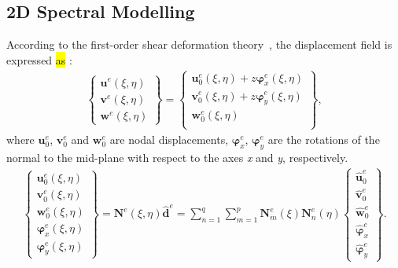 \documentclass[sensors,article,accept,moreauthors,pdftex]{Definitions/mdpi}
\begin{document}
\subsection{2D Spectral Modelling}
\label{sec:2D_SEM}

According to the first-order shear deformation theory~\cite{reissner1945effect, mindlin1951influence}, the displacement field is expressed \hl{as}%
:
\begin{eqnarray}
\left \{ \begin{array}{c}
\textbf{u}^e(\xi,\eta) \\
\textbf{v}^e(\xi,\eta) \\
\textbf{w}^e(\xi,\eta)
\end{array} \right\} = 
\left \{ \begin{array}{c}
\textbf{u}_0^e(\xi,\eta) + z\boldsymbol{\varphi}_x^e(\xi,\eta)\\
\textbf{v}_0^e(\xi,\eta) + z\boldsymbol{\varphi}_y^e(\xi,\eta)\\
\textbf{w}_0^e(\xi,\eta) \\
\end{array} \right\},
\end{eqnarray}
where \(\textbf{u}_0^e\), \(\textbf{v}_0^e\) and \(\textbf{w}_0^e\) are nodal displacements, \(\boldsymbol{\varphi}_x^e\), \(\boldsymbol{\varphi}_y^e\) are the rotations of the normal to the mid-plane with respect to the axes \textit{x} and \textit{y}, respectively.
\begin{eqnarray}
\left \{\begin{array}{c}
\textbf{u}_0^e(\xi,\eta) \\
\textbf{v}_0^e(\xi,\eta) \\
\textbf{w}_0^e(\xi,\eta) \\
\boldsymbol{\varphi}_x^e(\xi,\eta) \\
\boldsymbol{\varphi}_y^e(\xi,\eta)
\end{array} \right\}
= \textbf{N}^e(\xi,\eta)\widehat{\textbf{d}}^e
= \sum_{n=1}^q\sum_{m=1}^p\textbf{N}_m^e(\xi)\textbf{N}_n^e(\eta)
\left \{ \begin{array}{c}
\widehat{\textbf{u}}_0^e \\
\widehat{\textbf{v}}_0^e \\
\widehat{\textbf{w}}_0^e \\
\widehat{\boldsymbol{\varphi}}_x^e \\
\widehat{\boldsymbol{\varphi}}_y^e
\end{array} \right \}.
\end{eqnarray}
\end{document}

